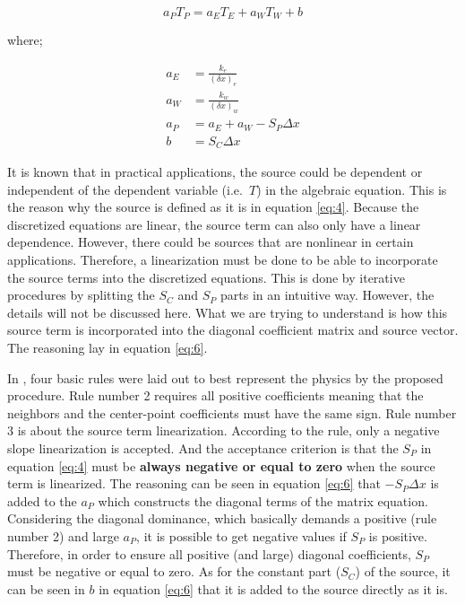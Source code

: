\documentclass[
]{book}
\begin{document}
\begin{equation}
a_P T_P=a_E T_E+a_W T_W+b
\label{eq:5}
\end{equation}

where;

\begin{equation}
\begin{aligned}
a_E &=\frac{k_e}{(\delta x)_e} \\
a_W &=\frac{k_w}{(\delta x)_w} \\
a_P &=a_E+a_W - S_P\Delta x \\
b &=S_C\Delta x 
\end{aligned}
 \label{eq:6}
\end{equation}

It is known that in practical applications, the source could be dependent or independent of the dependent variable (i.e.~\(T\)) in the algebraic equation. This is the reason why the source is defined as it is in equation \eqref{eq:4}. Because the discretized equations are linear, the source term can also only have a linear dependence. However, there could be sources that are nonlinear in certain applications. Therefore, a linearization must be done to be able to incorporate the source terms into the discretized equations. This is done by iterative procedures by splitting the \(S_C\) and \(S_P\) parts in an intuitive way. However, the details will not be discussed here. What we are trying to understand is how this source term is incorporated into the diagonal coefficient matrix and source vector. The reasoning lay in equation \eqref{eq:6}.

In \citet{patankar_2018_numerical}, four basic rules were laid out to best represent the physics by the proposed procedure. Rule number 2 requires all positive coefficients meaning that the neighbors and the center-point coefficients must have the same sign. Rule number 3 is about the source term linearization. According to the rule, only a negative slope linearization is accepted. And the acceptance criterion is that the \(S_P\) in equation \eqref{eq:4} must be \textbf{always negative or equal to zero} when the source term is linearized. The reasoning can be seen in equation \eqref{eq:6} that \(- S_P\Delta x\) is added to the \(a_P\) which constructs the diagonal terms of the matrix equation. Considering the diagonal dominance, which basically demands a positive (rule number 2) and large \(a_P\), it is possible to get negative values if \(S_P\) is positive. Therefore, in order to ensure all positive (and large) diagonal coefficients, \(S_P\) must be negative or equal to zero. As for the constant part (\(S_C\)) of the source, it can be seen in \(b\) in equation \eqref{eq:6} that it is added to the source directly as it is.
\end{document}
